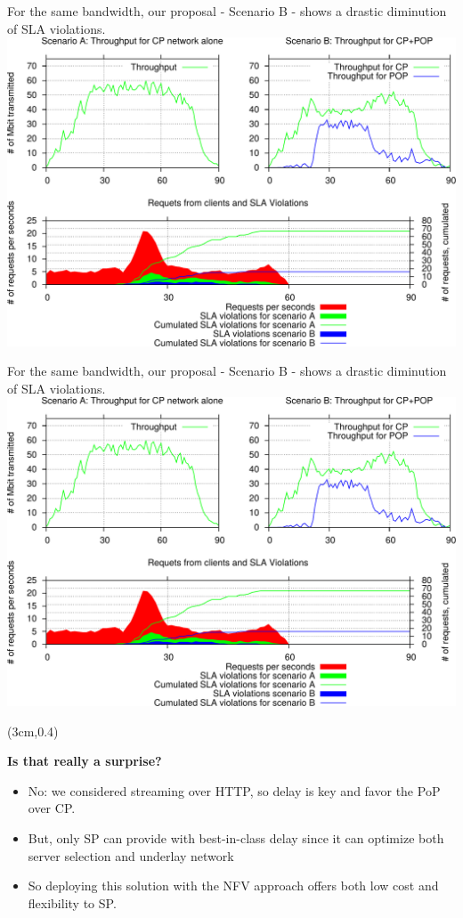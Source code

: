 \documentclass[a4paper]{beamer}
\begin{document}
\begin{frame}{For the same bandwidth, our proposal - Scenario B - shows a drastic diminution of SLA violations.}
	\includegraphics[width=0.90\linewidth]{CP+POP_evaluation.pdf}
\end{frame}

\begin{frame}{For the same bandwidth, our proposal - Scenario B - shows a drastic diminution of SLA violations.}
	\includegraphics[width=0.90\linewidth]{CP+POP_evaluation.pdf}
		\begin{textblock*}{8cm}(3cm,0.4\textheight)
		\begin{alertblock}{}
			\textbf{ Is that really a surprise? }
			\begin{itemize}
				\item No: we considered streaming over HTTP, so delay is key and favor the PoP over CP.
				\item But, only SP can provide with best-in-class delay since it can optimize both server selection and underlay network
				\item So deploying this solution with the NFV approach offers both low cost and flexibility to SP.
			\end{itemize}
		\end{alertblock}
	\end{textblock*}		
\end{frame}
\end{document}
